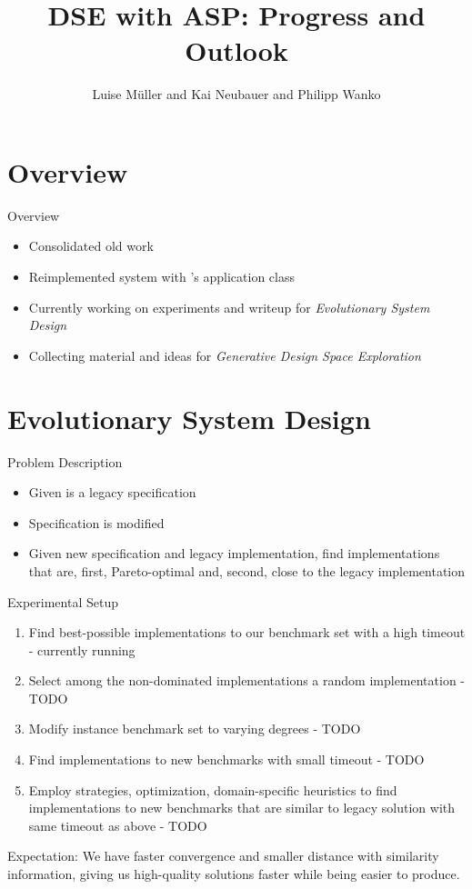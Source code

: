 \documentclass[11pt]{beamer}
\author[Müller et al.]{Luise Müller and Kai Neubauer and Philipp Wanko}
\title[DSE with ASP: Progress and Outlook]{DSE with ASP: Progress and Outlook}
\date{}
\begin{document}



\begin{frame}
\titlepage
\end{frame}

\section{Overview}

\begin{frame}{Overview}
\begin{itemize}
  \item Consolidated old work
  \item Reimplemented system with \clingo's application class
  \pause
  \item Currently working on experiments and writeup for \emph{Evolutionary System Design}
  \pause
  \item Collecting material and ideas for \emph{Generative Design Space Exploration}
\end{itemize}
\end{frame}

\section{Evolutionary System Design}

\begin{frame}{Problem Description}
  \begin{itemize}
    \item Given is a legacy specification
    \item Specification is modified
    \item Given new specification and legacy implementation, find implementations that are, first, Pareto-optimal and, second, close to the legacy implementation
  \end{itemize}
\end{frame}

\begin{frame}{Experimental Setup}
  \begin{enumerate}
    \item Find best-possible implementations to our benchmark set with a high timeout - currently running
    \item Select among the non-dominated implementations a random implementation - TODO
    \item Modify instance benchmark set to varying degrees - TODO
    \item Find implementations to new benchmarks with small timeout - TODO
    \item Employ strategies, optimization, domain-specific heuristics to find implementations to new benchmarks that are similar to legacy solution with same timeout as above - TODO
  \end{enumerate}
  \pause
  Expectation: We have faster convergence and smaller distance with similarity information, giving us high-quality solutions faster while being easier to produce.
\end{frame}
\end{document}
